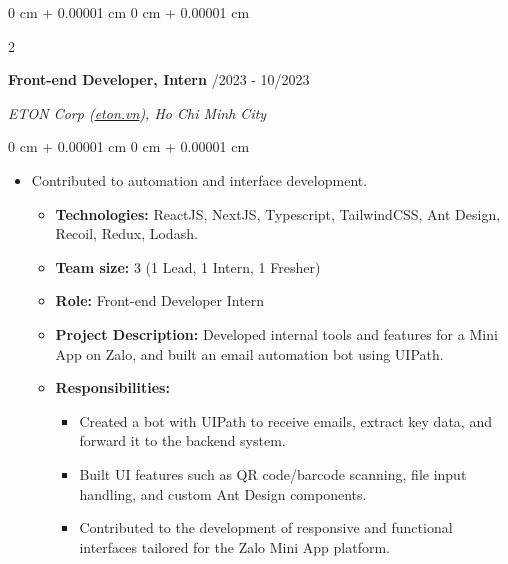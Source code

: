 \documentclass[10pt, letterpaper]{article}
\newenvironment{highlights}{
    \begin{itemize}[
        topsep=0.10 cm,
        parsep=0.10 cm,
        partopsep=0pt,
        itemsep=0pt,
        leftmargin=0 cm + 10pt
    ]
}{
    \end{itemize}
} %
\newenvironment{onecolentry}{
    \begin{adjustwidth}{
        0 cm + 0.00001 cm
    }{
        0 cm + 0.00001 cm
    }
}{
    \end{adjustwidth}
} %
\newenvironment{twocolentry}[2][]{
    \onecolentry
    \def\secondColumn{#2}
    \setcolumnwidth{\fill, 4.5 cm}
    \begin{paracol}{2}
}{
    \switchcolumn \raggedleft \secondColumn
    \end{paracol}
    \endonecolentry
} %
\begin{document}
        \vspace{0.2 cm}
        \begin{twocolentry}{
            06/2023 - 10/2023
        }
        \textbf{Front-end Developer, Intern}\end{twocolentry}
        \vspace{0.10 cm}
        \par{\textit{ETON Corp (\href{https://eton.vn/}{eton.vn}), Ho Chi Minh City}}
        \vspace{0.10 cm}
        \begin{onecolentry}
            \begin{highlights}
                \item Contributed to automation and interface development.
                \begin{itemize}
                    \item {\bf Technologies:} ReactJS, NextJS, Typescript, TailwindCSS, Ant Design, Recoil, Redux, Lodash.
                    \item {\bf Team size:} 3 (1 Lead, 1 Intern, 1 Fresher)
                    \item {\bf Role:} Front-end Developer Intern
                    \item {\bf Project Description:} Developed internal tools and features for a Mini App on Zalo, and built an email automation bot using UIPath.
                    \item {\bf Responsibilities:}
                    \begin{itemize}
                        \item Created a bot with UIPath to receive emails, extract key data, and forward it to the backend system.
                        \item Built UI features such as QR code/barcode scanning, file input handling, and custom Ant Design components.
                        \item Contributed to the development of responsive and functional interfaces tailored for the Zalo Mini App platform.
                    \end{itemize}
                \end{itemize}
            \end{highlights}
        \end{onecolentry}
\end{document}
